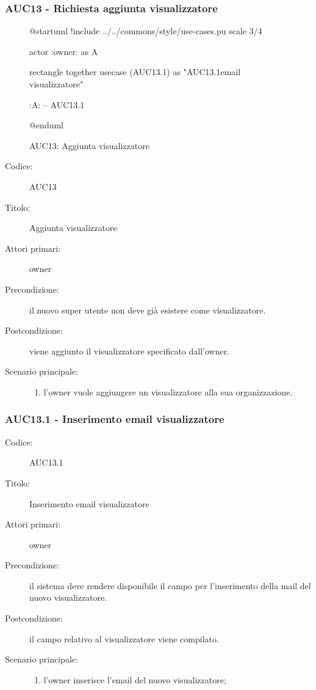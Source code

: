\documentclass[../analisi-dei-requisiti.tex]{subfiles}
\begin{document}
\subsubsection{AUC13 - Richiesta aggiunta visualizzatore}%
\label{subsub:AUC13}

\begin{figure}[h!]
  \centering
  \begin{plantuml}
  @startuml
  !include ../../commons/style/use-cases.pu
  scale 3/4

  actor :owner: as A

  rectangle {
    together {
      usecase (AUC13.1) as "AUC13.1\nInserimento email visualizzatore"
    }
  }

  :A: -- AUC13.1

  @enduml
  \end{plantuml}
  \caption{AUC13: Aggiunta visualizzatore}
  \label{fig:auc13}
\end{figure}

\begin{description}
  \item[Codice:] AUC13
  \item[Titolo:] Aggiunta visualizzatore
  \item[Attori primari:] owner
  \item[Precondizione:] il nuovo super utente non deve già esistere come visualizzatore.
  \item[Postcondizione:] viene aggiunto il visualizzatore specificato dall'owner.
  \item[Scenario principale:]
  \begin{enumerate}
    \item l'owner vuole aggiungere un visualizzatore alla sua organizzazione.
  \end{enumerate}
\end{description}

\subsubsection{AUC13.1 - Inserimento email visualizzatore}%
\label{subsub:AUC13.1}
\begin{description}
  \item[Codice:] AUC13.1
  \item[Titolo:] Inserimento email visualizzatore
  \item[Attori primari:] owner
  \item[Precondizione:] il sistema deve rendere disponibile il campo per l'inserimento della mail del nuovo visualizzatore.
  \item[Postcondizione:] il campo relativo al visualizzatore viene compilato.
  \item[Scenario principale:]
  \begin{enumerate}
    \item l'owner inserisce l'email del nuovo visualizzatore;
  \end{enumerate}
\end{description}
\end{document}
